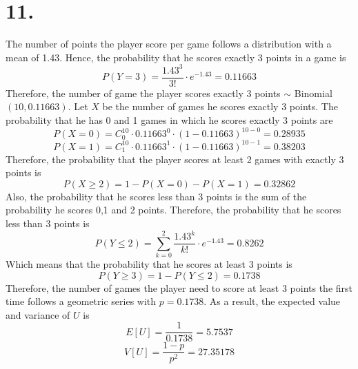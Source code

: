 \documentclass[11pt]{article}
\begin{document}
\section*{11.}
The number of points the player score per game follows a distribution with a mean of 1.43.
Hence, the probability that he scores exactly 3 points in a game is
\[
P(Y=3) = \frac{1.43^3}{3!} \cdot e^{-1.43} = 0.11663
\] 
Therefore, the number of game the player scores exactly 3 points $\sim$ Binomial$(10,0.11663)$. Let $X$ be the number of games he scores exactly 3 points. The probability that he has 0 and 1 games in which he scores exactly 3 points are
\[
P(X=0) = C^{10}_0 \cdot 0.11663^0 \cdot (1-0.11663)^{10-0} = 0.28935
\]
\[
P(X=1) = C^{10}_1 \cdot 0.11663^1 \cdot (1-0.11663)^{10-1} = 0.38203
\]
Therefore, the probability that the player scores at least 2 games with exactly 3 points is
\[
P(X\ge 2) = 1 - P(X=0) - P(X=1) = 0.32862
\]
Also, the probability that he scores less than 3 points is the sum of the probability he scores 0,1 and 2 points. Therefore, the probability that he scores less than 3 points is 
\[
P(Y\le 2) = \sum_{k=0}^2 \frac{1.43^k}{k!} \cdot e^{-1.43} = 0.8262
\]
Which means that the probability that he scores at least 3 points is 
\[
P(Y \ge 3) = 1 - P(Y\le 2) = 0.1738 
\]
Therefore, the number of games the player need to score at least 3 points the first time follows a geometric series with $p=0.1738$. As a result, the expected value and variance of $U$ is 
\[
E[U] = \frac{1}{0.1738} = 5.7537
\]
\[
V[U] = \frac{1-p}{p^2} = 27.35178
\]
\end{document}
